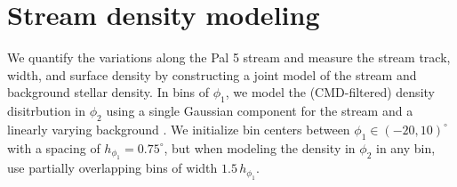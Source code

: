 \documentclass[twocolumn]{aastex62}
\begin{document}
\section{Stream density modeling}
\label{sec:densitymodel}

We quantify the variations along the Pal 5 stream and measure the stream track, width, and surface density by constructing a joint model of the stream and background stellar density.
In bins of $\phi_1$, we model the (CMD-filtered) density disitrbution in $\phi_2$ using a single Gaussian component for the stream and a linearly varying background \citep[similar to the density modeling described in][]{Price-Whelan:2018}.
We initialize bin centers between $\phi_1 \in (-20, 10)^\circ$ with a spacing of $h_{\phi_1} = 0.75^\circ$, but when modeling the density in $\phi_2$ in any bin, use partially overlapping bins of width $1.5\,h_{\phi_1}$.
\end{document}
